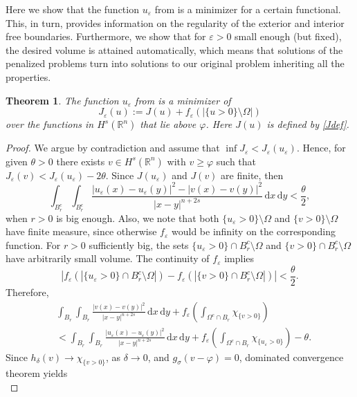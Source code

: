 \documentclass[11pt, reqno]{amsart}
\newtheorem{theorem}{Theorem}
\numberwithin{equation}{section}
\numberwithin{theorem}{section}
\numberwithin{lemma}{section}
\numberwithin{corollary}{section}
\numberwithin{remark}{section}
\numberwithin{proposition}{section}
\numberwithin{definition}{section}
\newcommand{\R}{\mathbb{R}}
\newcommand{\e}{\varepsilon}
\begin{document}
Here we show that the function $u_\varepsilon$ from  is a minimizer for a certain functional. This, in turn, provides information on the regularity of the exterior and interior free boundaries. Furthermore, we show that for $\varepsilon>0$ small enough (but fixed), the desired volume is attained automatically, which means that solutions of the penalized problems turn into solutions to our original problem inheriting all the properties.
\begin{theorem}\label{t5.1}
	The function $u_\varepsilon$ from  is a minimizer of
	$$
	J_\varepsilon(u):=J(u)+
	f_\varepsilon(|\{u>0\}\setminus\Omega|)
	$$
	over the functions in $H^s(\R^n)$ that lie above $\varphi$. Here $J(u)$ is defined by \eqref{Jdef}.
\end{theorem}
\begin{proof}
	We argue by contradiction and assume that $\inf J_{\e}<J_{\e}(u_\e)$. Hence, for given $\theta>0$ there exists $v\in H^s(\R^n)$ with $v\geq\varphi$ such that $J_{\e}(v)<J_{\e}(u_\e)-2\theta$. Since $J(u_\varepsilon)$ and $J(v)$ are finite, then 
    \[ \int_{B_r^c}\int_{B_r^c}\frac{|u_\e(x)-u_\e(y)|^2-|v(x)-v(y)|^2}{|x-y|^{n+2s}}\,\mathrm{d}x\,\mathrm{d}y<\frac{\theta}{2},\]
	when $r>0$ is big enough. Also, we note that both $\{u_\varepsilon>0\}\setminus\Omega$ and $\{v>0\}\setminus\Omega$ have finite measure, since otherwise $f_\e$ would be infinity on the corresponding function. For $r>0$ sufficiently big,
	the sets $\{u_\varepsilon>0\}\cap B_r^c\setminus\Omega$ and $\{v>0\}\cap B_r^c\setminus\Omega$ have arbitrarily small volume. The continuity of $f_\e$ implies
	\[ |f_\e\left(|\{u_\varepsilon>0\}\cap B_r^c\setminus\Omega|\right)-f_\e\left(|\{v>0\}\cap B_r^c\setminus\Omega|\right)|<\frac{\theta}{2}. \]
	Therefore, 
	\begin{equation}\label{5.1}
	\begin{split}
	&\int_{B_r}\int_{B_{r}}\frac{|v(x)-v(y)|^{2}}{|x-y|^{n+2s}}\,\mathrm{d}x\,\mathrm{d}y+f_\varepsilon\left(\int_{\Omega^c\cap B_r}\chi_{\{v>0\}}\right) \\
	&<\int_{B_r}\int_{B_{r}}\frac{|u_\e(x)-u_\e(y)|^{2}}{|x-y|^{n+2s}}\,\mathrm{d}x\,\mathrm{d}y+f_\varepsilon\left(\int_{\Omega^c\cap B_r}\chi_{\{u_\varepsilon>0\}}\right)-\theta.
	\end{split}
	\end{equation}
	Since $h_\delta(v)\rightarrow\chi_{\{v>0\}}$, as $\delta\rightarrow0$, and $g_\sigma(v-\varphi)=0$, dominated convergence theorem yields
	\begin{equation}

\end{equation}
\end{proof}
\end{document}

